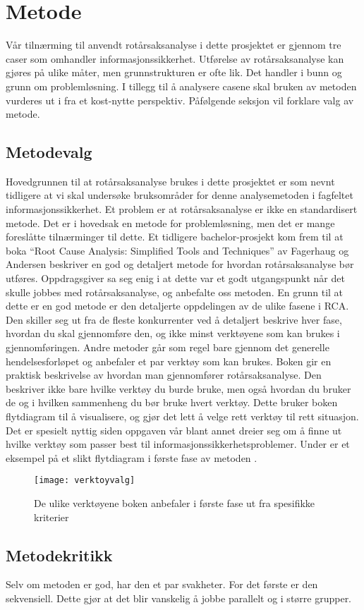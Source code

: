\chapter{Metode}
\label{kap:metode}
Vår tilnærming til anvendt rotårsaksanalyse i dette prosjektet er gjennom tre caser som omhandler informasjonssikkerhet. Utførelse av rotårsaksanalyse kan gjøres på ulike måter, men grunnstrukturen er ofte lik. Det handler i bunn og grunn om problemløsning. I tillegg til å analysere casene skal bruken av metoden vurderes ut i fra et kost-nytte perspektiv. Påfølgende seksjon vil forklare valg av metode. 

\section{Metodevalg}
Hovedgrunnen til at rotårsaksanalyse brukes i dette prosjektet er som nevnt tidligere at vi skal undersøke bruksområder for denne analysemetoden i fagfeltet informasjonssikkerhet. Et problem er at rotårsaksanalyse er ikke en standardisert metode. Det er i hovedsak en metode for problemløsning, men det er mange foreslåtte tilnærminger til dette. Et tidligere bachelor-prosjekt \cite{} kom frem til at boka ``Root Cause Analysis: Simplified Tools and Techniques'' av Fagerhaug og Andersen \cite{RCA} beskriver en god og detaljert metode for hvordan rotårsaksanalyse bør utføres. Oppdragsgiver sa seg enig i at dette var et godt utgangspunkt når det skulle jobbes med rotårsaksanalyse, og anbefalte oss metoden. En grunn til at dette er en god metode er den detaljerte oppdelingen av de ulike fasene i RCA. Den skiller seg ut fra de fleste konkurrenter ved å detaljert beskrive hver fase, hvordan du skal gjennomføre den, og ikke minst verktøyene som kan brukes i gjennomføringen. Andre metoder går som regel bare gjennom det generelle hendelsesforløpet og anbefaler et par verktøy som kan brukes. Boken gir en praktisk beskrivelse av hvordan man gjennomfører rotårsaksanalyse. Den beskriver ikke bare hvilke verktøy du burde bruke, men også hvordan du bruker de og i hvilken sammenheng du bør bruke hvert verktøy. Dette bruker boken flytdiagram til å visualisere, og gjør det lett å velge rett verktøy til rett situasjon. Det er spesielt nyttig siden oppgaven vår blant annet dreier seg om å finne ut hvilke verktøy som passer best til informasjonssikkerhetsproblemer. Under er et eksempel på et slikt flytdiagram i første fase av metoden \cite{RCA}.

\begin{figure}[H]
    \centering
    \texttt{[image: verktoyvalg]}
    \caption[RCA-verktoyvalg]{De ulike verktøyene boken anbefaler i første fase ut fra spesifikke kriterier}
    \label{fig:verktoyvalg}
\end{figure}

\section{Metodekritikk}
Selv om metoden er god, har den et par svakheter. For det første er den sekvensiell. Dette gjør at det blir vanskelig å jobbe parallelt og i større grupper. 